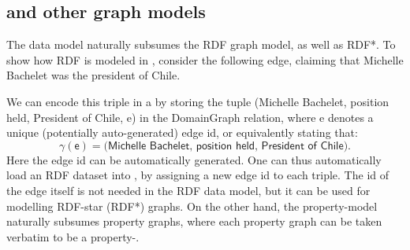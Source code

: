 \subsection{\Data and other graph models}\label{ssec:whydg}

The \data data model naturally subsumes the RDF graph model, as well as RDF*. To show how RDF is modeled in \datas, consider the following edge, claiming that Michelle Bachelet was the president of Chile.

\medskip
\begin{center}
\end{center}
\medskip

\noindent
We can encode this triple in a \data by storing the tuple \textsf{(Michelle Bachelet, position held, President of Chile, e)} in the \textsf{DomainGraph} relation, where \textsf{e} denotes a unique (potentially auto-generated) edge id, or equivalently stating that:
$$\gamma(\textsf{e}) = \textsf{(Michelle Bachelet, position held, President of Chile)}.$$
Here the edge id can be automatically generated. One can thus automatically load an RDF dataset into \Data, by assigning a new edge id to each triple. The id of the edge itself is not needed in the RDF data model, but it can be used for modelling RDF-star (RDF*) graphs. On the other hand, the property-\Data model naturally subsumes property graphs, where each property graph can be taken verbatim to be a property-\Data.



